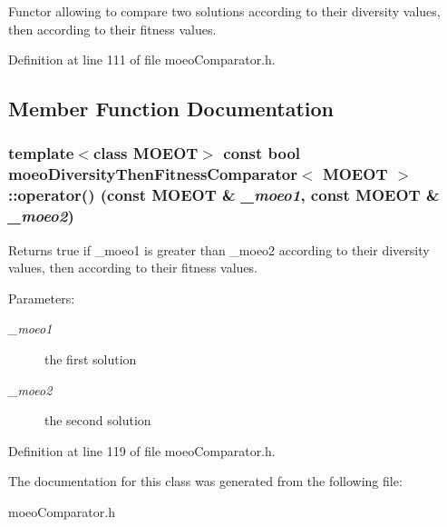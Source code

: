 Functor allowing to compare two solutions according to their diversity values, then according to their fitness values. 



Definition at line 111 of file moeo\-Comparator.h.

\subsection{Member Function Documentation}
\subsubsection{\setlength{\rightskip}{0pt plus 5cm}template$<$class MOEOT$>$ const bool {\bf moeo\-Diversity\-Then\-Fitness\-Comparator}$<$ MOEOT $>$::operator() (const MOEOT \& {\em \_\-moeo1}, const MOEOT \& {\em \_\-moeo2})\hspace{0.3cm}{\tt  [inline]}}\label{classmoeoDiversityThenFitnessComparator_62620887203d033af92091d838d4b0b6}


Returns true if \_\-moeo1 is greater than \_\-moeo2 according to their diversity values, then according to their fitness values. 

\begin{Desc}
\item[Parameters:]
\begin{description}
\item[{\em \_\-moeo1}]the first solution \item[{\em \_\-moeo2}]the second solution \end{description}
\end{Desc}


Definition at line 119 of file moeo\-Comparator.h.

The documentation for this class was generated from the following file:\begin{CompactItemize}
\item 
moeo\-Comparator.h\end{CompactItemize}
